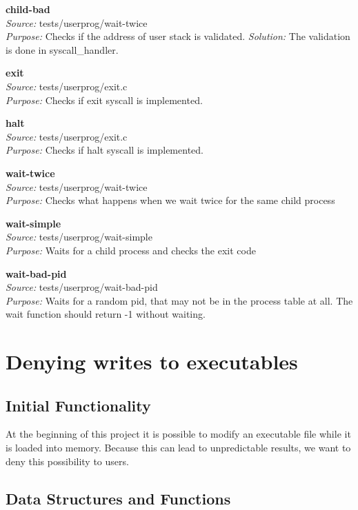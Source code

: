       \textbf{child-bad}\\
      \textit{Source:} tests/userprog/wait-twice\\
      \textit{Purpose:} Checks if the address of user stack is validated.
      \textit{Solution:} The validation is done in syscall\_handler.

      \textbf{exit}\\
      \textit{Source:} tests/userprog/exit.c\\
      \textit{Purpose:} Checks if exit syscall is implemented.

      \textbf{halt}\\
      \textit{Source:} tests/userprog/exit.c\\
      \textit{Purpose:} Checks if halt syscall is implemented.
      
      \textbf{wait-twice}\\
      \textit{Source:} tests/userprog/wait-twice\\
      \textit{Purpose:} Checks what happens when we wait twice for the same child process

      \textbf{wait-simple}\\
      \textit{Source:} tests/userprog/wait-simple\\
      \textit{Purpose:} Waits for a child process and checks the exit code

      \textbf{wait-bad-pid} \\
      \textit{Source:} tests/userprog/wait-bad-pid\\
      \textit{Purpose:} Waits for a random pid, that may not be in the process table at all. The wait function should return -1 without waiting.
    
\section{Denying writes to executables}

     \subsection{Initial Functionality}

	At the beginning of this project it is possible to modify an executable file while it is loaded into memory. Because this can lead to unpredictable results, we want to deny this possibility to users.

    \subsection{Data Structures and Functions}

